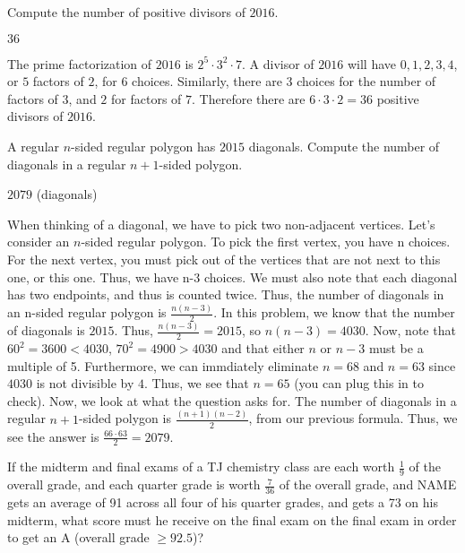 \documentclass[11pt]{article}
\begin{document}
\begin{problem}
Compute the number of positive divisors of $2016$.
\end{problem}

\begin{answer}
$\boxed{36}$
\end{answer}

\begin{solution}
The prime factorization of $2016$ is $2^5 \cdot 3^2 \cdot 7$. A divisor of $2016$ will have $0, 1, 2, 3, 4$, or $5$ factors of $2$, for $6$ choices. Similarly, there are $3$ choices for the number of factors of $3$, and $2$ for factors of $7$. Therefore there are $6 \cdot 3 \cdot 2 = \boxed{36}$ positive divisors of $2016$.
\end{solution}

\begin{problem}
A regular $n$-sided regular polygon has $2015$ diagonals. Compute the number of diagonals in a regular $n+1$-sided polygon.
\end{problem}

\begin{answer}
$\boxed{2079}$ (diagonals)
\end{answer}

\begin{solution}
When thinking of a diagonal, we have to pick two non-adjacent vertices. Let's consider an $n$-sided regular polygon. To pick the first vertex, you have n choices. For the next vertex, you must pick out of the vertices that are not next to this one, or this one. Thus, we have n-3 choices. We must also note that each diagonal has two endpoints, and thus is counted twice. Thus, the number of diagonals in an n-sided regular polygon is $\frac{n(n-3)}{2}$. In this problem, we know that the number of diagonals is $2015$. Thus, $\frac{n(n-3)}{2} = 2015$, so $n(n-3) = 4030$. Now, note that $60^2 = 3600 < 4030$, $70^2 = 4900 > 4030$ and that either $n$ or $n-3$ must be a multiple of 5. Furthermore, we can immdiately eliminate $n = 68$ and $n = 63$ since $4030$ is not divisible by $4$. Thus, we see that $n = 65$ (you can plug this in to check). Now, we look at what the question asks for. The number of diagonals in a regular $n+1$-sided polygon is $\frac{(n+1)(n-2)}{2}$, from our previous formula. Thus, we see the answer is $\frac{66 \cdot 63}{2} = 2079$.
\end{solution}


\begin{problem}
If the midterm and final exams of a TJ chemistry class are each worth $\frac{1}{9}$ of the overall grade, and each quarter grade is worth $\frac{7}{36}$ of the overall grade, and NAME gets an average of 91 across all four of his quarter grades, and gets a 73 on his midterm, what score must he receive on the final exam on the final exam in order to get an A (overall grade $\geq 92.5$)?
\end{problem}
\end{document}
